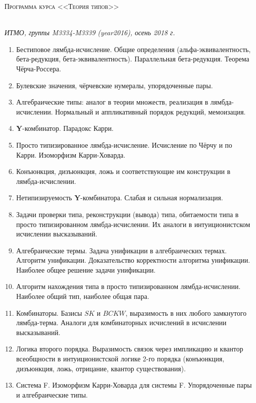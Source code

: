 \documentclass[11pt,a4paper,oneside]{book}
\begin{document}
\pagestyle{empty}

\begin{center}
\begin{Large}\scshape Программа курса <<Теория типов>>\end{Large}\\\vspace{0.1cm}
\textit{ИТМО, группы M3334-M3339 (year2016), осень 2018 г.}
\end{center}

\begin{enumerate}
\item Бестиповое лямбда-исчисление. Общие определения (альфа-эквивалентность, бета-редукция, 
бета-эк\-ви\-ва\-лент\-ность).
Параллельная бета-редукция. Теорема Чёрча-Россера.
\item Булевские значения, чёрчевские нумералы, упорядоченные пары.
\item Алгебраические типы: аналог в теории множеств, реализация в лямбда-исчислении. 
Нормальный и аппликативный порядок редукций, мемоизация.
\item \textbf{Y}-комбинатор. Парадокс Карри.
\item Просто типизированное лямбда-исчисление. Исчисление по Чёрчу и по Карри. Изоморфизм Карри-Ховарда.
\item Конъюнкция, дизъюнкция, ложь и соответствующие им конструкции в лямбда-исчислении.
\item Нетипизируемость \textbf{Y}-комбинатора. Слабая и сильная нормализация.
\item Задачи проверки типа, реконструкции (вывода) типа, обитаемости типа в просто типизированном лямбда-исчислении.
Их аналоги в интуиционистском исчислении высказываний.
\item Алгебраические термы. Задача унификации в алгебраических термах. Алгоритм унификации. Доказательство 
корректности алгоритма унификации. Наиболее общее решение задачи унификации.
\item Алгоритм нахождения типа в просто типизированном лямбда-исчислении. Наиболее общий тип, наиболее общая пара.
\item Комбинаторы. Базисы $SK$ и $BCKW$, выразимость в них любого замкнутого лямбда-терма.
Аналоги для комбинаторных исчислений в исчислении высказываний.
\item Логика второго порядка. Выразимость связок через импликацию и квантор всеобщности в интуиционистской логике 
2-го порядка (конъюнкция, дизъюнкция, ложь, отрицание, квантор существования).
\item Система F. Изоморфизм Карри-Ховарда для системы F. Упорядоченные пары и алгебраические типы.

\end{enumerate}
\end{document}
